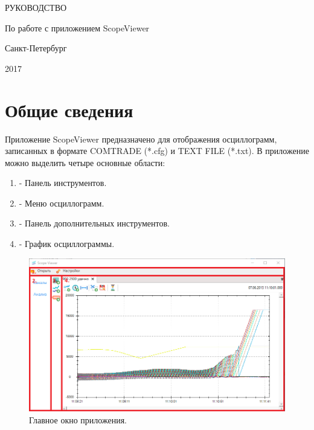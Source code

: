 \documentclass[a4paper,12pt]{article}
\begin{document}
 
 
 
 
 
\begin{titlepage} 
\newpage 
 
 
\begin{center} 
\end{center} 
 
 
\vspace{40ex} 
 
 
\begin{center} 
\LARGE РУКОВОДСТВО 
\end{center} 
 
 
\begin{center} 
\Large По работе с приложением ScopeViewer 
\end{center} 
 
 
\vspace{55ex} 
 
 
\begin{center} 
\Large Санкт-Петербург 
\end{center} 
 
 
\begin{center} 
\Large 2017 
\end{center} 
 
 
\end{titlepage} 
 
 
\section*{\hspace{.5cm}Общие сведения } 
\hspace{.5cm}Приложение ScopeViewer предназначено для отображения осциллограмм, записанных в формате COMTRADE (*.cfg) и TEXT FILE (*.txt). В приложение можно выделить четыре основные области:  
\begin{enumerate} 
\item - Панель инструментов. 
\item - Меню осциллограмм. 
\item - Панель дополнительных инструментов. 
\item - График осциллограммы. 
\end {enumerate} 
 
 
\begin{figure}[h] 
\centering 
\includegraphics[width=80ex]{image/Screenshot_7.png} 
\caption{Главное окно приложения.} 
\end{figure} 
 
\end{document}
